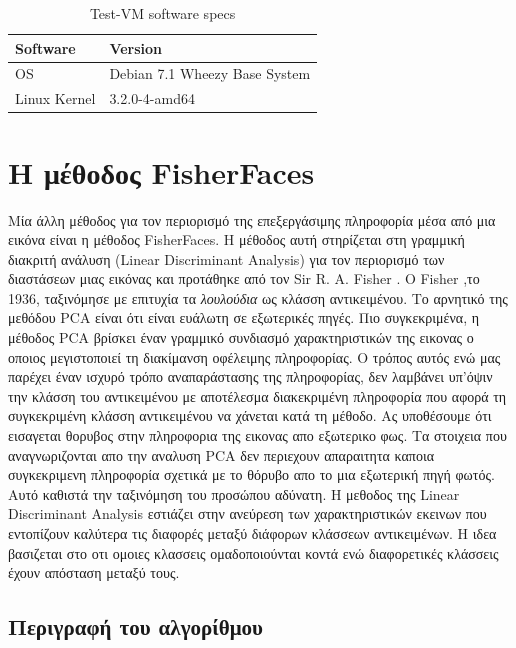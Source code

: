 \begin{table}[htbp]
  \centering
  \begin{tabular}{ | l | l | }
    \hline
    Software & Version \\ \hline \hline
    OS & Debian 7.1 Wheezy Base System \\
    \hline
    Linux Kernel & 3.2.0-4-amd64  \\
    \hline
  \end{tabular}
  \caption{Test-VM software specs}
  \label{tab:soft-specs}
\end{table}

\section{H μέθοδος FisherFaces}\label{sec:fisher}

Μία άλλη μέθοδος για τον περιορισμό της επεξεργάσιμης πληροφορία μέσα από μια
εικόνα είναι η μέθοδος FisherFaces. Η μέθοδος αυτή στηρίζεται στη γραμμική
διακριτή ανάλυση (Linear Discriminant Analysis) για τον περιορισμό των διαστάσεων
μιας εικόνας και  προτάθηκε από τον Sir R. A. Fisher \cite{}. Ο Fisher
,το 1936, ταξινόμησε με επιτυχία τα \emph{λουλούδια} ως κλάσση αντικειμένου.
Το αρνητικό της μεθόδου PCA είναι ότι είναι ευάλωτη σε εξωτερικές πηγές. Πιο
συγκεκριμένα, η μέθοδος PCA βρίσκει έναν γραμμικό συνδιασμό χαρακτηριστικών
της εικονας ο οποιος μεγιστοποιεί τη διακίμανση οφέλειμης πληροφορίας. Ο τρόπος
αυτός ενώ μας παρέχει έναν ισχυρό τρόπο αναπαράστασης της πληροφορίας, δεν λαμβάνει
υπ'όψιν την κλάσση του αντικειμένου με αποτέλεσμα διακεκριμένη πληροφορία που αφορά
τη συγκεκριμένη κλάσση αντικειμένου να χάνεται κατά τη μέθοδο. Ας υποθέσουμε ότι
εισαγεται θορυβος στην πληροφορια της εικονας απο εξωτερικο φως. Τα στοιχεια που
αναγνωριζονται απο την αναλυση PCA δεν περιεχουν απαραιτητα καποια συγκεκριμενη
πληροφορία σχετικά με το θόρυβο απο το μια εξωτερική πηγή φωτός. Αυτό καθιστά
την ταξινόμηση του προσώπου αδύνατη.
Η μεθοδος της Linear Discriminant Analysis εστιάζει στην ανεύρεση των χαρακτηριστικών
εκεινων που εντοπίζουν καλύτερα τις διαφορές μεταξύ διάφορων κλάσσεων αντικειμένων.
Η ιδεα βασιζεται στο οτι ομοιες κλασσεις ομαδοποιούνται κοντά ενώ διαφορετικές κλάσσεις
έχουν απόσταση μεταξύ τους.


\subsection{Περιγραφή του αλγορίθμου}\label{subsec:fisheralgo}

